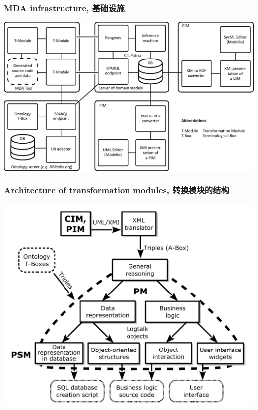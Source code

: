 \documentclass[10pt]{beamer}
\begin{document}
\begin{frame}
  \frametitle{MDA infrastructure,  基础设施}
  \centering
  \includegraphics[width=1\linewidth]{architecture-mda-lod-ext.pdf}
\end{frame}

\begin{frame}
  \frametitle{Architecture of transformation modules, 转换模块的结构}
  \centering
  \includegraphics[width=0.9\linewidth]{architect_tree_pres-en-wo-OCL.pdf}
\end{frame}
\end{document}
